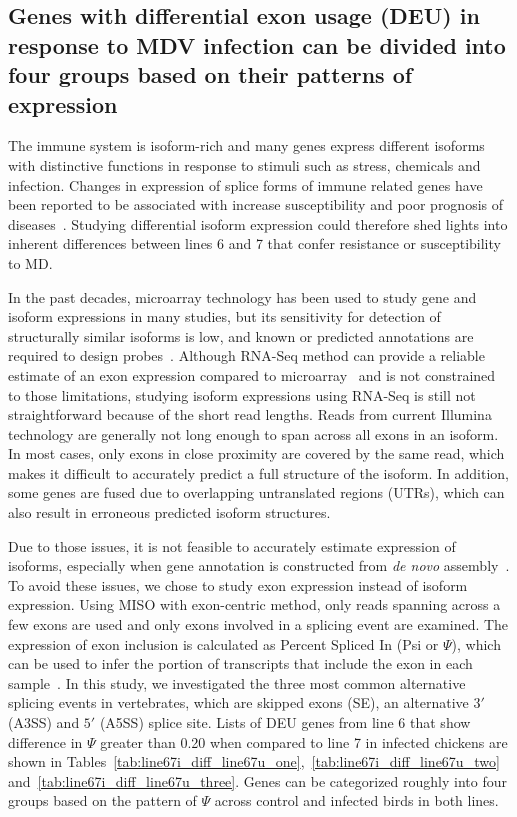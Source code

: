 \documentclass[10pt]{article}
\begin{document}
\subsection*{Genes with differential exon usage (DEU) in response to MDV
infection can be divided into four groups based on their patterns of expression}

The immune system is isoform-rich and many genes express different isoforms with
distinctive functions in response to stimuli such as stress, chemicals and
infection.  Changes in expression of splice forms of immune related genes have
been reported to be associated with increase susceptibility and poor prognosis
of diseases~\cite{lynch2004consequences}.  Studying differential isoform
expression could therefore shed lights into inherent differences between lines 6
and 7 that confer resistance or susceptibility to MD.

In the past decades, microarray technology has been used to study gene and
isoform expressions in many studies, but its sensitivity for detection of
structurally similar isoforms is low, and known or predicted annotations are
required to design probes~\cite{kane2000assessment}.  Although RNA-Seq method
can provide a reliable estimate of an exon expression compared to
microarray~\cite{pan2008deep} and is not constrained to those limitations,
studying isoform expressions using RNA-Seq is still not straightforward because
of the short read lengths.  Reads from current Illumina technology are generally
not long enough to span across all exons in an isoform.  In most cases, only
exons in close proximity are covered by the same read, which makes it difficult
to accurately predict a full structure of the isoform.  In addition, some genes
are fused due to overlapping untranslated regions (UTRs), which can also result
in erroneous predicted isoform structures.

Due to those issues, it is not feasible to accurately estimate expression of
isoforms, especially when gene annotation is constructed from {\em de novo}
assembly~\cite{trapnell2013differential}.  To avoid these issues, we chose to
study exon expression instead of isoform expression.  Using MISO with
exon-centric method, only reads spanning across a few exons are used and only
exons involved in a splicing event are examined.  The expression of exon
inclusion is calculated as Percent Spliced In (Psi or $\Psi$), which can be used
to infer the portion of transcripts that include the exon in each
sample~\cite{Katz:2010iv}.  In this study, we investigated the three most common
alternative splicing events in vertebrates, which are skipped exons (SE), an
alternative $3\prime$ (A3SS) and $5\prime$ (A5SS) splice site.
Lists of DEU genes from line 6 that show difference in $\Psi$ greater than 0.20
when compared to line 7 in infected chickens are shown in
Tables~\ref{tab:line67i_diff_line67u_one},~\ref{tab:line67i_diff_line67u_two}
and~\ref{tab:line67i_diff_line67u_three}.  Genes can be categorized roughly into
four groups based on the pattern of $\Psi$ across control and infected birds in
both lines.
\end{document}
